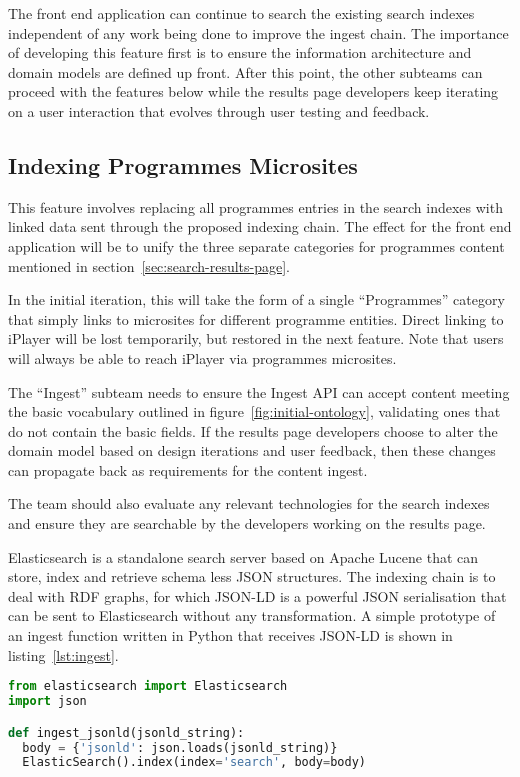 The front end application can continue to search the
existing search indexes independent of any work being done
to improve the ingest chain. The importance of developing
this feature first is to ensure the information architecture
and domain models are defined up front. After this point,
the other subteams can proceed with the features below
while the results page developers keep iterating on
a user interaction that evolves through user testing and
feedback.

\subsection{Indexing Programmes Microsites}

This feature involves replacing all programmes entries in
the search indexes with linked data sent through the proposed
indexing chain. The effect for the front end application
will be to unify the three separate categories for
programmes content mentioned in section~\ref{sec:search-results-page}.

In the initial iteration, this will take the form of a single
``Programmes'' category that simply links to microsites
for different programme entities. Direct linking to iPlayer
will be lost temporarily, but restored in the next
feature. Note that users will always be able to reach
iPlayer via programmes microsites.

The ``Ingest'' subteam needs to ensure the Ingest API can
accept content meeting the basic vocabulary outlined in
figure~\ref{fig:initial-ontology}, validating ones
that do not contain the basic fields. If
the results page developers choose to alter the domain
model based on design iterations and user feedback, then
these changes can propagate back as requirements for the
content ingest.

The team should also evaluate any relevant technologies for the
search indexes and ensure they are searchable by the
developers working on the results page.

Elasticsearch is a standalone search server based on Apache Lucene
that can store, index and retrieve schema less JSON structures.
The indexing chain is to deal with RDF graphs, for which JSON-LD
is a powerful JSON serialisation that can be sent to Elasticsearch
without any transformation.
A simple prototype of an ingest function written in Python
that receives JSON-LD is shown in listing~\ref{lst:ingest}.

\begin{lstlisting}[language=Python,label=lst:ingest,caption=Python code to index JSON-LD strings in Elasticsearch.]
from elasticsearch import Elasticsearch
import json

def ingest_jsonld(jsonld_string):
  body = {'jsonld': json.loads(jsonld_string)}
  ElasticSearch().index(index='search', body=body)
\end{lstlisting}

